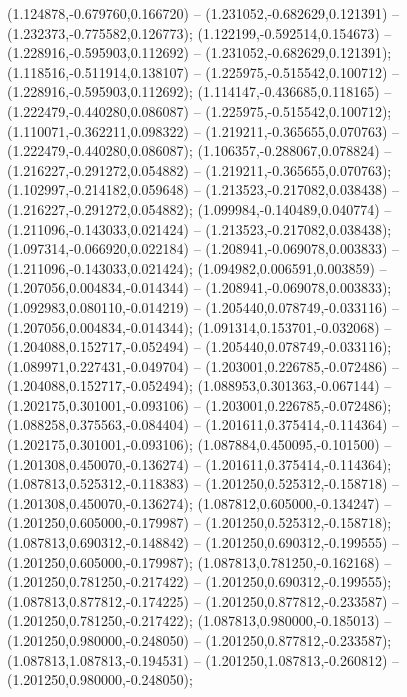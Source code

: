  (1.124878,-0.679760,0.166720) -- (1.231052,-0.682629,0.121391) -- (1.232373,-0.775582,0.126773);
 (1.122199,-0.592514,0.154673) -- (1.228916,-0.595903,0.112692) -- (1.231052,-0.682629,0.121391);
 (1.118516,-0.511914,0.138107) -- (1.225975,-0.515542,0.100712) -- (1.228916,-0.595903,0.112692);
 (1.114147,-0.436685,0.118165) -- (1.222479,-0.440280,0.086087) -- (1.225975,-0.515542,0.100712);
 (1.110071,-0.362211,0.098322) -- (1.219211,-0.365655,0.070763) -- (1.222479,-0.440280,0.086087);
 (1.106357,-0.288067,0.078824) -- (1.216227,-0.291272,0.054882) -- (1.219211,-0.365655,0.070763);
 (1.102997,-0.214182,0.059648) -- (1.213523,-0.217082,0.038438) -- (1.216227,-0.291272,0.054882);
 (1.099984,-0.140489,0.040774) -- (1.211096,-0.143033,0.021424) -- (1.213523,-0.217082,0.038438);
 (1.097314,-0.066920,0.022184) -- (1.208941,-0.069078,0.003833) -- (1.211096,-0.143033,0.021424);
 (1.094982,0.006591,0.003859) -- (1.207056,0.004834,-0.014344) -- (1.208941,-0.069078,0.003833);
 (1.092983,0.080110,-0.014219) -- (1.205440,0.078749,-0.033116) -- (1.207056,0.004834,-0.014344);
 (1.091314,0.153701,-0.032068) -- (1.204088,0.152717,-0.052494) -- (1.205440,0.078749,-0.033116);
 (1.089971,0.227431,-0.049704) -- (1.203001,0.226785,-0.072486) -- (1.204088,0.152717,-0.052494);
 (1.088953,0.301363,-0.067144) -- (1.202175,0.301001,-0.093106) -- (1.203001,0.226785,-0.072486);
 (1.088258,0.375563,-0.084404) -- (1.201611,0.375414,-0.114364) -- (1.202175,0.301001,-0.093106);
 (1.087884,0.450095,-0.101500) -- (1.201308,0.450070,-0.136274) -- (1.201611,0.375414,-0.114364);
 (1.087813,0.525312,-0.118383) -- (1.201250,0.525312,-0.158718) -- (1.201308,0.450070,-0.136274);
 (1.087812,0.605000,-0.134247) -- (1.201250,0.605000,-0.179987) -- (1.201250,0.525312,-0.158718);
 (1.087813,0.690312,-0.148842) -- (1.201250,0.690312,-0.199555) -- (1.201250,0.605000,-0.179987);
 (1.087813,0.781250,-0.162168) -- (1.201250,0.781250,-0.217422) -- (1.201250,0.690312,-0.199555);
 (1.087813,0.877812,-0.174225) -- (1.201250,0.877812,-0.233587) -- (1.201250,0.781250,-0.217422);
 (1.087813,0.980000,-0.185013) -- (1.201250,0.980000,-0.248050) -- (1.201250,0.877812,-0.233587);
 (1.087813,1.087813,-0.194531) -- (1.201250,1.087813,-0.260812) -- (1.201250,0.980000,-0.248050);
